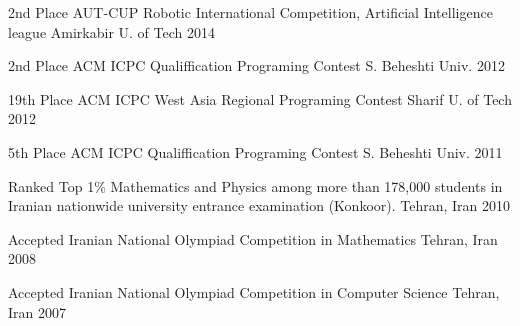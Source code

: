 




\begin{cvhonors}

  \cvhonor
    {2nd Place} %
    {AUT-CUP Robotic International Competition, Artificial Intelligence league} %
    {Amirkabir U. of Tech} %
    {2014} %

  \cvhonor
    {2nd Place} %
    {ACM ICPC Qualiffication Programing Contest} %
    {S. Beheshti Univ.} %
    {2012} %

  \cvhonor
    {19th Place} %
    {ACM ICPC West Asia Regional Programing Contest} %
    {Sharif U. of Tech} %
    {2012} %

  \cvhonor
    {5th Place} %
    {ACM ICPC Qualiffication Programing Contest} %
    {S. Beheshti Univ.} %
    {2011} %

  \cvhonor
    {Ranked Top 1\%} %
    {Mathematics and Physics among more than 178,000 students in Iranian nationwide university entrance examination (Konkoor).} %
    {Tehran, Iran} %
    {2010} %

  \cvhonor
    {Accepted} %
    {Iranian National Olympiad Competition in Mathematics} %
    {Tehran, Iran} %
    {2008} %

  \cvhonor
    {Accepted} %
    {Iranian National Olympiad Competition in Computer Science} %
    {Tehran, Iran} %
    {2007} %

\end{cvhonors}

